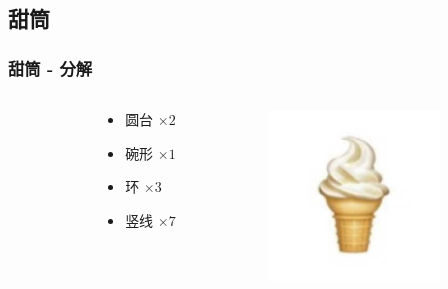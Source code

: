 \documentclass[aspectratio=169]{ctexbeamer} %
\begin{document}
\subsection{甜筒}
\begin{frame}
    \frametitle{甜筒 - 分解} %
    \begin{columns}
    \begin{column}{.1\textwidth}\end{column}
        \begin{column}{.4\textwidth}
            \begin{itemize}
                \item 圆台 $\times 2$
                \item 碗形 $\times 1$
                \item 环 $\times 3$
                \item 竖线 $\times 7$
            \end{itemize}
        \end{column}
        \begin{column}{.5\textwidth}
            \includegraphics[width=128pt]{images/pre/emoji.pdf}
        \end{column}
    \end{columns}
\end{frame}
\end{document}
